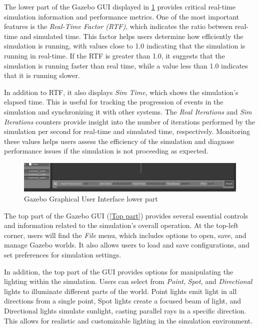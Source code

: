 \documentclass[../../main]{subfiles}
\begin{document}
The lower part of the Gazebo GUI displayed in \cref{Lower part} provides critical real-time simulation information 
and performance metrics. One of the most important features is the \emph{Real-Time 
Factor (RTF)}, which indicates the ratio between real-time and simulated time. This 
factor helps users determine how efficiently the simulation is running, with values 
close to 1.0 indicating that the simulation is running in real-time. If the RTF is 
greater than 1.0, it suggests that the simulation is running faster than real time, 
while a value less than 1.0 indicates that it is running slower.

In addition to RTF, it also displays \emph{Sim Time}, which 
shows the simulation's elapsed time. This is useful for tracking the progression of 
events in the simulation and synchronizing it with other systems. The \emph{Real Iterations} 
and \emph{Sim Iterations} counters provide insight into the number of iterations performed 
by the simulation per second for real-time and simulated time, respectively. Monitoring 
these values helps users assess the efficiency of the simulation and diagnose performance 
issues if the simulation is not proceeding as expected.

\begin{figure}[H]
    \centering
\includegraphics[width=\textwidth]{fig/gui_lower_part.png}
\caption{Gazebo Graphical User Interface lower part}
\label{Lower part} %
\end{figure}

The top part of the Gazebo GUI (\cref{Top part}) provides several essential controls and information 
related to the simulation’s overall operation. At the top-left corner, users will find the 
\emph{File} menu, which includes options to open, save, and manage Gazebo worlds. 
It also allows users to load and save configurations, and set preferences for simulation 
settings. 

In addition, the top part of the GUI provides options for manipulating the lighting 
within the simulation. Users can select from \emph{Point}, \emph{Spot}, and 
\emph{Directional} lights to illuminate different parts of the world. Point lights 
emit light in all directions from a single point, Spot lights create a focused beam 
of light, and Directional lights simulate sunlight, casting parallel rays in a 
specific direction. This allows for realistic and customizable lighting in the 
simulation environment. 
\end{document}
